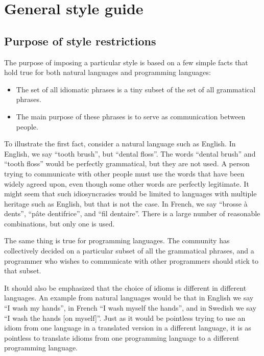 \chapter{General \commonlisp{} style guide}

\section{Purpose of style restrictions}

The purpose of imposing a particular style is based on a few simple
facts that hold true for both natural languages and programming
languages:

\begin{itemize}
\item The set of all idiomatic phrases is a tiny subset of the set of
  all grammatical phrases.
\item The main purpose of these phrases is to serve as communication
  between people.
\end{itemize}

To illustrate the first fact, consider a natural language such as
English.  In English, we say ``tooth brush'', but ``dental floss''.
The words ``dental brush'' and ``tooth floss'' would be perfectly
grammatical, but they are not used.  A person trying to communicate
with other people must use the words that have been widely agreed
upon, even though some other words are perfectly legitimate.  It might
seem that such idiosyncrasies would be limited to languages with
multiple heritage such as English, but that is not the case.  In
French, we say ``brosse à dents'', ``pâte dentifrice'', and ``fil
dentaire''.  There is a large number of reasonable combinations, but
only one is used.

The same thing is true for programming languages.  The community has
collectively decided on a particular subset of all the grammatical
phrases, and a programmer who wishes to communicate with other
programmers should stick to that subset.

It should also be emphasized that the choice of idioms is different in
different languages.  An example from natural languages would be that
in English we say ``I wash my hands'', in French ``I wash myself the
hands'', and in Swedish we say ``I wash the hands [on myself]''.  Just
as it would be pointless trying to use an idiom from one language in a
translated version in a different language, it is as pointless to
translate idioms from one programming language to a different
programming language.

